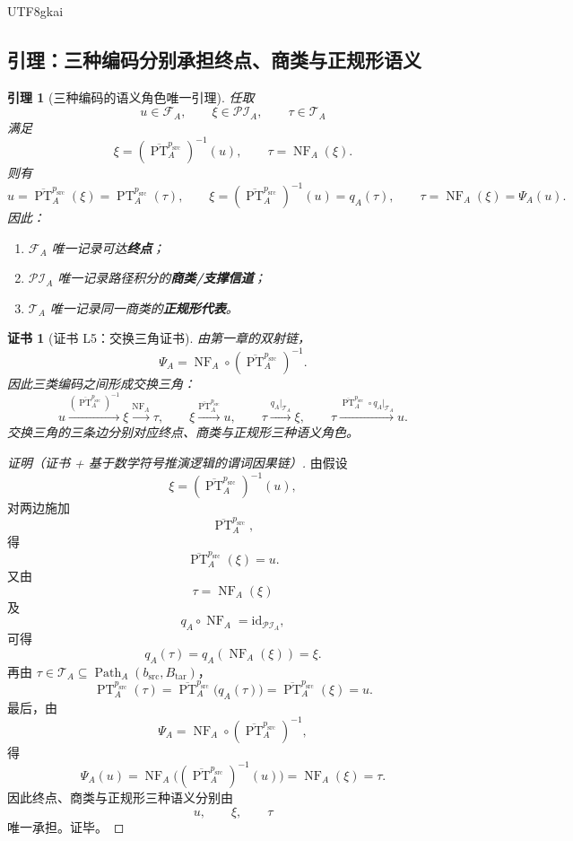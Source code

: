 \documentclass[12pt]{article}
\newtheorem{lemma}{引理}[section]
\newtheorem{Certificate}{证书}[section]
\newcommand{\Path}{\operatorname{Path}}
\newcommand{\PT}{\operatorname{PT}}
\newcommand{\NF}{\operatorname{NF}}
\newcommand{\id}{\mathrm{id}}
\begin{document}
\begin{CJK*}{UTF8}{gkai}
\subsection{引理：三种编码分别承担终点、商类与正规形语义}
\label{subsec:tex36-three-code-roles}

\begin{lemma}[三种编码的语义角色唯一引理]
\label{lem:tex36-three-code-roles}
任取
\[
  u\in \mathcal F_A,
  \qquad
  \xi\in \mathcal{PI}_A,
  \qquad
  \tau\in \mathcal T_A
\]
满足
\[
  \xi=(\overline{\PT}_A^{p_{\mathrm{src}}})^{-1}(u),
  \qquad
  \tau=\NF_A(\xi).
\]
则有
\[
  u=\overline{\PT}_A^{p_{\mathrm{src}}}(\xi)=\PT_A^{p_{\mathrm{src}}}(\tau),
  \qquad
  \xi=(\overline{\PT}_A^{p_{\mathrm{src}}})^{-1}(u)=q_A(\tau),
  \qquad
  \tau=\NF_A(\xi)=\Psi_A(u).
\]
因此：
\begin{enumerate}
  \item $\mathcal F_A$ 唯一记录可达\textbf{终点}；
  \item $\mathcal{PI}_A$ 唯一记录路径积分的\textbf{商类/支撑信道}；
  \item $\mathcal T_A$ 唯一记录同一商类的\textbf{正规形代表}。
\end{enumerate}
\end{lemma}

\begin{Certificate}[证书 L5：交换三角证书]
\label{cert:tex36-l5}
由第一章的双射链，
\[
  \Psi_A
  =
  \NF_A\circ (\overline{\PT}_A^{p_{\mathrm{src}}})^{-1}.
\]
因此三类编码之间形成交换三角：
\[
  u
  \xrightarrow{(\overline{\PT}_A^{p_{\mathrm{src}}})^{-1}}
  \xi
  \xrightarrow{\NF_A}
  \tau,
  \qquad
  \xi
  \xrightarrow{\overline{\PT}_A^{p_{\mathrm{src}}}}
  u,
  \qquad
  \tau
  \xrightarrow{q_A|_{\mathcal T_A}}
  \xi,
  \qquad
  \tau
  \xrightarrow{\overline{\PT}_A^{p_{\mathrm{src}}}\circ q_A|_{\mathcal T_A}}
  u.
\]
交换三角的三条边分别对应终点、商类与正规形三种语义角色。
\end{Certificate}

\begin{proof}[证明（证书 + 基于数学符号推演逻辑的谓词因果链）]
由假设
\[
  \xi=(\overline{\PT}_A^{p_{\mathrm{src}}})^{-1}(u),
\]
对两边施加
\[
  \overline{\PT}_A^{p_{\mathrm{src}}},
\]
得
\[
  \overline{\PT}_A^{p_{\mathrm{src}}}(\xi)=u.
\]
又由
\[
  \tau=\NF_A(\xi)
\]
及
\[
  q_A\circ \NF_A=\id_{\mathcal{PI}_A},
\]
可得
\[
  q_A(\tau)=q_A(\NF_A(\xi))=\xi.
\]
再由 $\tau\in \mathcal T_A\subseteq \Path_A(b_{\mathrm{src}},B_{\mathrm{tar}})$，
\[
  \PT_A^{p_{\mathrm{src}}}(\tau)
  =
  \overline{\PT}_A^{p_{\mathrm{src}}}\bigl(q_A(\tau)\bigr)
  =
  \overline{\PT}_A^{p_{\mathrm{src}}}(\xi)
  =
  u.
\]
最后，由
\[
  \Psi_A
  =
  \NF_A\circ(\overline{\PT}_A^{p_{\mathrm{src}}})^{-1},
\]
得
\[
  \Psi_A(u)
  =
  \NF_A\bigl((\overline{\PT}_A^{p_{\mathrm{src}}})^{-1}(u)\bigr)
  =
  \NF_A(\xi)
  =
  \tau.
\]
因此终点、商类与正规形三种语义分别由
\[
  u,\qquad \xi,\qquad \tau
\]
唯一承担。证毕。
\end{proof}


\end{CJK*}
\end{document}
